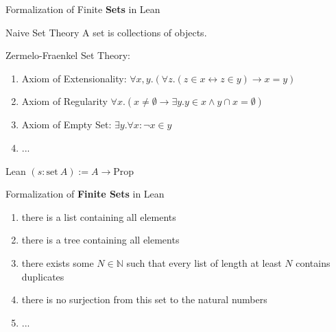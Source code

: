 \documentclass[aspectratio=169]{beamer}
\begin{document}
    \begin{frame}{Formalization of Finite \textbf{Sets} in Lean}
        \begin{block}{Naive Set Theory}
            A set is collections of objects.
        \end{block}
        \pause
        \begin{block}{Zermelo-Fraenkel Set Theory:}
        \begin{enumerate}
            \item Axiom of Extensionality:
            $\forall x, y.(\forall z. (z \in x \leftrightarrow z \in y) \rightarrow x=y)$
            
            \item Axiom of Regularity 
            $\forall x. (x \neq \emptyset \rightarrow \exists y. y \in x \land y \cap x = \emptyset ) $
            
            \item Axiom of Empty Set: $\exists y. \forall x: \neg x \in y$
            \item ...
            
        \end{enumerate}
        \end{block}
        \pause
        \begin{block}{Lean}
        $(s: \text{{set}}\ A) := A \to \text{{Prop}}$
        \end{block}
    \end{frame}
    \begin{frame}{Formalization of \textbf{Finite Sets} in Lean}
        \begin{enumerate}[<+->]
            \item there is a list containing all elements
            \item there is a tree containing all elements
            \item there exists some $N \in \mathbb{N}$ such that every list of length at least $N$ contains duplicates
            \item there is no surjection from this set to the natural numbers
            \item ...
        \end{enumerate}
    \end{frame}
    
\end{document}
